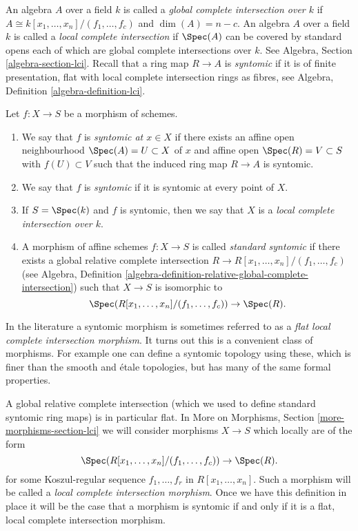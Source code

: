 \noindent
An algebra $A$ over a field $k$ is called a
{\it global complete intersection over $k$}
if $A \cong k[x_1, \ldots, x_n]/(f_1, \ldots, f_c)$ and
$\dim(A) = n - c$. An algebra $A$ over a field $k$ is called a
{\it local complete intersection} if $\Spec(A)$
can be covered by standard opens each of which are global
complete intersections over $k$. See Algebra, Section
\ref{algebra-section-lci}. Recall that a ring map $R \to A$
is {\it syntomic} if it is of finite presentation,
flat with local complete intersection rings as fibres,
see Algebra, Definition \ref{algebra-definition-lci}.

\begin{definition}
\label{definition-syntomic}
Let $f : X \to S$ be a morphism of schemes.
\begin{enumerate}
\item We say that $f$ is {\it syntomic at $x \in X$} if
there exists an affine open neighbourhood $\Spec(A) = U \subset X$
of $x$ and affine open $\Spec(R) = V \subset S$
with $f(U) \subset V$ such that the induced ring map
$R \to A$ is syntomic.
\item We say that $f$ is {\it syntomic} if it is syntomic
at every point of $X$.
\item If $S = \Spec(k)$ and $f$ is syntomic, then we say that
$X$ is a {\it local complete intersection over $k$}.
\item A morphism of affine schemes $f : X \to S$
is called {\it standard syntomic} if there exists a
global relative complete intersection
$R \to R[x_1, \ldots, x_n]/(f_1, \ldots, f_c)$ (see
Algebra,
Definition \ref{algebra-definition-relative-global-complete-intersection})
such that $X \to S$ is isomorphic to
$$
\Spec(R[x_1, \ldots, x_n]/(f_1, \ldots, f_c)) \to \Spec(R).
$$
\end{enumerate}
\end{definition}

\noindent
In the literature a syntomic morphism is sometimes referred to as a
{\it flat local complete intersection morphism}.
It turns out this is a convenient class of morphisms. For example one
can define a syntomic topology using these, which is finer than the
smooth and \'etale topologies, but has many of the same formal properties.

\medskip\noindent
A global relative complete intersection (which we used to define standard
syntomic ring maps) is in particular flat. In
More on Morphisms, Section \ref{more-morphisms-section-lci}
we will consider morphisms $X \to S$ which locally are of the form
$$
\Spec(R[x_1, \ldots, x_n]/(f_1, \ldots, f_c)) \to \Spec(R).
$$
for some Koszul-regular sequence $f_1, \ldots, f_r$ in $R[x_1, \ldots, x_n]$.
Such a morphism will be called a {\it local complete intersection morphism}.
Once we have this definition in place it will be the case that a morphism
is syntomic if and only if it is a flat, local complete intersection morphism.

